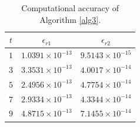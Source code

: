 \documentclass[preprint,11pt,3p]{elsarticle}
\begin{document}
\begin{table}[H]
	\begin{center}
		\begin{tabular}{ c  c c} %
			\toprule
			$t$ &$\epsilon_{r1}$  & $\epsilon_{r2}$\\
			\midrule
			$1$    & $1.0391 \times 10^{-13}$&            $9.5143 \times 10^{-15} $     \\
			$3$  & $3.3531 \times 10^{-13}$ &            $4.0017 \times 10^{-14} $        \\ 
			$5$  & $2.4956 \times 10^{-13}$& $4.7754 \times 10^{-14} $        \\ 
			$7$   & $2.9334\times 10^{-13}$&            $4.3344 \times 10^{-14} $          \\ 
			$9$  & $4.8715 \times 10^{-13}$               & $7.1455 \times 10^{-14} $       \\
			\bottomrule
		\end{tabular}
		\caption{Computational accuracy of Algorithm \ref{alg3}.} \label{tab21}
	\end{center}
\end{table}
\end{document}
